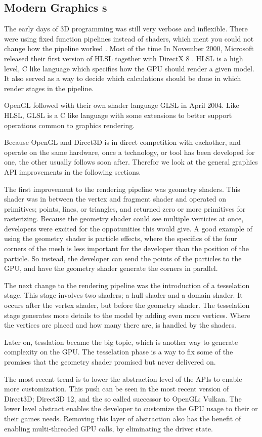 \subsection{Modern Graphics s}

The early days of 3D programming was still very verbose and inflexible. 
There were using fixed function pipelines instead of shaders, which ment you could not change how the pipeline worked \cite{davidovic2014fixedfunction}.
Most of the time 
In November 2000, Microsoft released their first version of \gls{HLSL} together with DirectX 8 \cite{wikipedia????directx}.
\Gls{HLSL} is a high level, C like language which specifies how the \gls{GPU} should render a given model.
It also served as a way to decide which calculations should be done in which render stages in the pipeline.

OpenGL followed with their own shader language \gls{GLSL} in April 2004.
Like \gls{HLSL}, \gls{GLSL} is a C like language with some extensions to better support operations common to graphics rendering.

Because OpenGL and Direct3D is in direct competition with eachother, and operate on the same hardware, once a technology, or tool has been developed for one, the other usually follows soon after.
Therefor we look at the general graphics \gls{API} improvements in the following sections.

The first improvement to the rendering pipeline was geometry shaders.
This shader was in between the vertex and fragment shader and operated on primitives; points, lines, or triangles, and returned zero or more primitives for rasterizing.
Because the geometry shader could see multiple verticies at once, developers were excited for the oppotunities this would give.
A good example of using the geometry shader is particle effects, where the specifics of the four corners of the mesh is less important for the developer than the position of the particle.
So instead, the developer can send the points of the particles to the \gls{GPU}, and have the geometry shader generate the corners in parallel.

The next change to the rendering pipeline was the introduction of a tesselation stage.
This stage involves two shaders; a hull shader and a domain shader.
It occurs after the vertex shader, but before the geometry shader.
The tesselation stage generates more details to the model by adding even more vertices.
Where the vertices are placed and how many there are, is handled by the shaders.

Later on, tesslation became the big topic, which is another way to generate complexity on the \gls{GPU}.
The tesselation phase is a way to fix some of the promises that the geometry shader promised but never delivered on.

The most recent trend is to lower the abstraction level of the \glspl{API} to enable more customization.
This push can be seen in the most recent version of Direct3D; Direct3D 12, and the so called successor to OpenGL; Vulkan.
The lower level abstract enables the developer to customize the \gls{GPU} usage to their or their games needs.
Removing this layer of abstraction also has the benefit of enabling multi-threaded \gls{GPU} calls, by eliminating the driver state.
